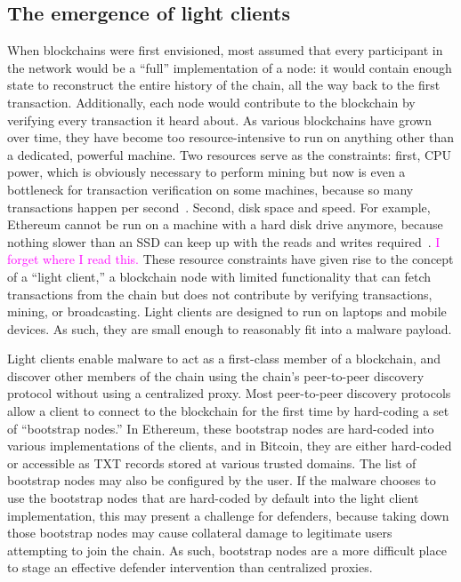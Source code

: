 \documentclass[10pt,sigconf,letterpaper]{acmart}
\newcommand{\randall}{\ding{110}\ding{43}\textcolor{magenta}}
\newcommand{\randall}{}
\begin{document}
\subsection{The emergence of light clients}

When blockchains were first envisioned, most assumed that every participant in 
the network would be a ``full'' implementation of a node: it would contain 
enough state to reconstruct the entire history of the chain, all the way back 
to the first transaction. Additionally, each node would contribute to the 
blockchain by verifying every transaction it heard about. As various 
blockchains have grown over time, they have become too resource-intensive to 
run on anything other than a dedicated, powerful machine. Two 
resources serve as 
the constraints: first, CPU power, which is obviously necessary to perform 
mining but now is even a bottleneck for transaction verification on some 
machines, because so many transactions happen per 
second~\cite{citation_needed}. Second, disk 
space and speed. For example, Ethereum cannot be run on a machine with a hard 
disk drive anymore, because nothing slower than an SSD can keep up with the 
reads and writes required~\cite{citation_needed}. \randall{I 
forget where I read this.} These resource constraints have 
given rise to the concept of a ``light client,'' a blockchain 
node with limited functionality that can fetch transactions 
from the chain but does not contribute by verifying 
transactions, mining, or broadcasting. Light clients are 
designed to run on laptops and mobile devices. As 
such, they are small enough to reasonably fit into a malware 
payload. 

Light clients enable malware to act as a first-class member 
of a blockchain, and discover other members of the chain 
using the chain's peer-to-peer discovery protocol without 
using a centralized proxy. Most peer-to-peer discovery 
protocols allow a client to connect to the blockchain for the 
first time by hard-coding a set of ``bootstrap nodes.'' In 
Ethereum, these bootstrap nodes are hard-coded into various 
implementations of the clients, and in Bitcoin, they are 
either hard-coded or accessible as TXT records stored at 
various trusted domains. The list of bootstrap nodes may also 
be configured by the user. If the 
malware chooses to use the bootstrap nodes that are 
hard-coded by default into the light client implementation, 
this may present a challenge for defenders, because taking 
down those bootstrap nodes may cause collateral damage to 
legitimate users attempting to join the chain. As such, 
bootstrap nodes are a more difficult place to stage an 
effective defender intervention than centralized proxies. 
\end{document}
